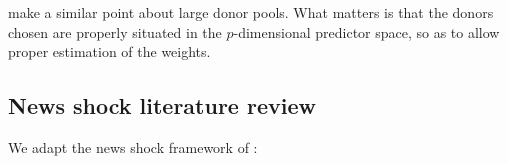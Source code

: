 \documentclass[11pt]{article}
\theoremstyle{definition}
\begin{document}
\citet{abadie2022synthetic} make a similar point about large donor pools.  What matters is that the donors chosen are properly situated in the $p$-dimensional predictor space, so as to allow proper estimation of the weights.

\subsection{News shock literature review}

We adapt the news shock framework of \citet{kilian2017structural}: \\
\end{document}

